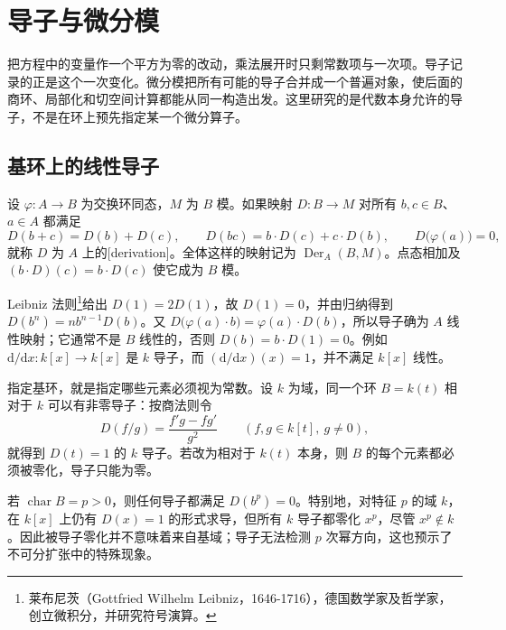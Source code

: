 
\section{导子与微分模}
\label{b3:sec:1401}


把方程中的变量作一个平方为零的改动，乘法展开时只剩常数项与一次项。导子记录的正是这个一次变化。微分模把所有可能的导子合并成一个普遍对象，使后面的商环、局部化和切空间计算都能从同一构造出发。这里研究的是代数本身允许的导子，不是在环上预先指定某一个微分算子。

\subsection{基环上的线性导子}
\label{b3:subsec:1401:01}

\begin{definition}\label{b3:def:relative-derivation}
	设 \(\varphi:A\rightarrow B\) 为交换环同态，\(M\) 为 \(B\) 模。如果映射 \(D:B\rightarrow M\) 对所有 \(b,c\in B\)、\(a\in A\) 都满足
	\[
		D(b+c)=D(b)+D(c),\qquad D(bc)=b\cdot D(c)+c\cdot D(b),\qquad D\bigl(\varphi(a)\bigr)=0,
	\]
	就称 \(D\) 为 \(A\) 上的[derivation]。全体这样的映射记为 \(\operatorname{Der}_A(B,M)\)。点态相加及 \((b\cdot D)(c)=b\cdot D(c)\) 使它成为 \(B\) 模。
\end{definition}

Leibniz 法则\footnote{莱布尼茨（Gottfried Wilhelm Leibniz，1646-1716），德国数学家及哲学家，创立微积分，并研究符号演算。}给出 \(D(1)=2D(1)\)，故 \(D(1)=0\)，并由归纳得到 \(D(b^n)=nb^{n-1}D(b)\)。又 \(D\bigl(\varphi(a)\cdot b\bigr)=\varphi(a)\cdot D(b)\)，所以导子确为 \(A\) 线性映射；它通常不是 \(B\) 线性的，否则 \(D(b)=b\cdot D(1)=0\)。例如 \(\mathrm{d}/\mathrm{d}x:k[x]\rightarrow k[x]\) 是 \(k\) 导子，而 \((\mathrm{d}/\mathrm{d}x)(x)=1\)，并不满足 \(k[x]\) 线性。

指定基环，就是指定哪些元素必须视为常数。设 \(k\) 为域，同一个环 \(B=k(t)\) 相对于 \(k\) 可以有非零导子：按商法则令
\[
	D(f/g)=\frac{f'g-fg'}{g^2}\qquad(f,g\in k[t],\ g\ne0),
\]
就得到 \(D(t)=1\) 的 \(k\) 导子。若改为相对于 \(k(t)\) 本身，则 \(B\) 的每个元素都必须被零化，导子只能为零。

\ProseParagraphBreak
若 \(\operatorname{char}B=p>0\)，则任何导子都满足 \(D(b^p)=0\)。特别地，对特征 \(p\) 的域 \(k\)，在 \(k[x]\) 上仍有 \(D(x)=1\) 的形式求导，但所有 \(k\) 导子都零化 \(x^p\)，尽管 \(x^p\notin k\)。因此被导子零化并不意味着来自基域；导子无法检测 \(p\) 次幂方向，这也预示了不可分扩张中的特殊现象。

